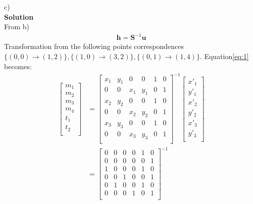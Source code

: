 \documentclass[letterpaper, 11pt]{article}
\begin{document}
c)\\
\textbf{Solution}\\
From b)
\begin{align}
    \textbf{h} = \textbf{S}^{-1} \textbf{u} \label{eq:1}
\end{align}
Transformation from the following points correspondences $\{(0,0)\rightarrow(1,2)\},
    \{(1,0)\rightarrow(3,2)\},\{(0,1)\rightarrow(1,4)\}$.
Equation\eqref{eq:1} becomes:
\begin{align*}
    \begin{bmatrix}
        m_1 \\
        m_2 \\
        m_3 \\
        m_4 \\
        t_1 \\
        t_2 \\
    \end{bmatrix}
     & =
    \begin{bmatrix}
        x_1 & y_1 & 0   & 0   & 1 & 0 \\
        0   & 0   & x_1 & y_1 & 0 & 1 \\
        x_2 & y_2 & 0   & 0   & 1 & 0 \\
        0   & 0   & x_2 & y_2 & 0 & 1 \\
        x_3 & y_3 & 0   & 0   & 1 & 0 \\
        0   & 0   & x_3 & y_3 & 0 & 1 \\
    \end{bmatrix}^{-1}
    \begin{bmatrix}
        x'_1 \\
        y'_1 \\
        x'_2 \\
        y'_2 \\
        x'_3 \\
        y'_3 \\
    \end{bmatrix} \\
     & =
    \begin{bmatrix}
        0 & 0 & 0 & 0 & 1 & 0 \\
        0 & 0 & 0 & 0 & 0 & 1 \\
        1 & 0 & 0 & 0 & 1 & 0 \\
        0 & 0 & 1 & 0 & 0 & 1 \\
        0 & 1 & 0 & 0 & 1 & 0 \\
        0 & 0 & 0 & 1 & 0 & 1 \\
    \end{bmatrix}^{-1}

\end{align*}
\end{document}
